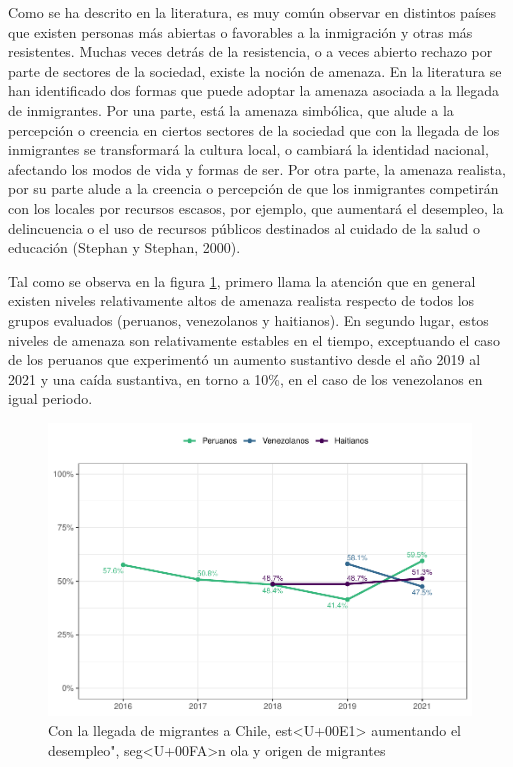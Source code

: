 \documentclass[
  12pt,
]{book}
\begin{document}
Como se ha descrito en la literatura, es muy común observar en distintos países que existen personas más abiertas o favorables a la inmigración y otras más resistentes. Muchas veces detrás de la resistencia, o a veces abierto rechazo por parte de sectores de la sociedad, existe la noción de amenaza. En la literatura se han identificado dos formas que puede adoptar la amenaza asociada a la llegada de inmigrantes. Por una parte, está la amenaza simbólica, que alude a la percepción o creencia en ciertos sectores de la sociedad que con la llegada de los inmigrantes se transformará la cultura local, o cambiará la identidad nacional, afectando los modos de vida y formas de ser. Por otra parte, la amenaza realista, por su parte alude a la creencia o percepción de que los inmigrantes competirán con los locales por recursos escasos, por ejemplo, que aumentará el desempleo, la delincuencia o el uso de recursos públicos destinados al cuidado de la salud o educación (Stephan y Stephan, 2000).

Tal como se observa en la figura \ref{fig:amen1-wave}, primero llama la atención que en general existen niveles relativamente altos de amenaza realista respecto de todos los grupos evaluados (peruanos, venezolanos y haitianos). En segundo lugar, estos niveles de amenaza son relativamente estables en el tiempo, exceptuando el caso de los peruanos que experimentó un aumento sustantivo desde el año 2019 al 2021 y una caída sustantiva, en torno a 10\%, en el caso de los venezolanos en igual periodo.

\begin{figure}

{\centering \includegraphics{reporte-elsoc_files/figure-latex/amen1-wave-1} 

}

\caption{Con la llegada de migrantes a Chile, est<U+00E1> aumentando el desempleo", seg<U+00FA>n ola y origen de migrantes}\label{fig:amen1-wave}
\end{figure}
\end{document}
